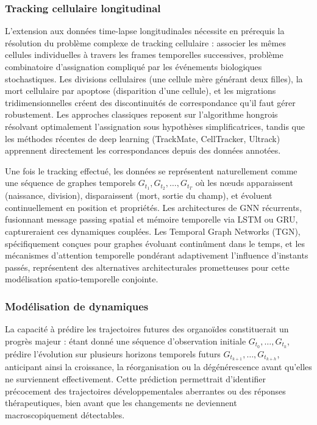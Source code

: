 \subsubsection{Tracking cellulaire longitudinal}

L'extension aux données time-lapse longitudinales nécessite en prérequis la résolution du problème complexe de tracking cellulaire : associer les mêmes cellules individuelles à travers les frames temporelles successives, problème combinatoire d'assignation compliqué par les événements biologiques stochastiques. Les divisions cellulaires (une cellule mère générant deux filles), la mort cellulaire par apoptose (disparition d'une cellule), et les migrations tridimensionnelles créent des discontinuités de correspondance qu'il faut gérer robustement. Les approches classiques reposent sur l'algorithme hongrois résolvant optimalement l'assignation sous hypothèses simplificatrices, tandis que les méthodes récentes de deep learning (TrackMate, CellTracker, Ultrack) apprennent directement les correspondances depuis des données annotées.

Une fois le tracking effectué, les données se représentent naturellement comme une séquence de graphes temporels $G_{t_1}, G_{t_2}, \ldots, G_{t_T}$ où les nœuds apparaissent (naissance, division), disparaissent (mort, sortie du champ), et évoluent continuellement en position et propriétés. Les architectures de GNN récurrents, fusionnant message passing spatial et mémoire temporelle via LSTM ou GRU, captureraient ces dynamiques couplées. Les Temporal Graph Networks (TGN), spécifiquement conçues pour graphes évoluant continûment dans le temps, et les mécanismes d'attention temporelle pondérant adaptivement l'influence d'instants passés, représentent des alternatives architecturales prometteuses pour cette modélisation spatio-temporelle conjointe.

\subsubsection{Modélisation de dynamiques}

La capacité à prédire les trajectoires futures des organoïdes constituerait un progrès majeur : étant donné une séquence d'observation initiale $G_{t_0}, \ldots, G_{t_k}$, prédire l'évolution sur plusieurs horizons temporels futurs $G_{t_{k+1}}, \ldots, G_{t_{k+h}}$, anticipant ainsi la croissance, la réorganisation ou la dégénérescence avant qu'elles ne surviennent effectivement. Cette prédiction permettrait d'identifier précocement des trajectoires développementales aberrantes ou des réponses thérapeutiques, bien avant que les changements ne deviennent macroscopiquement détectables.

